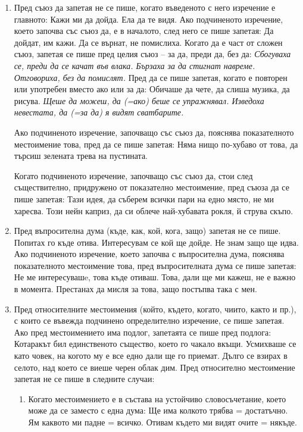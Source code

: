 \begin{enumerate}
\item Пред съюз да запетая не се пише, когато въведеното с него изречение е главното: Кажи ми да дойда. Ела да те видя. Ако подчиненото изречение, което започва със съюз да, е в началото, след него се пише запетая: Да дойдат, им кажи. Да се върнат, не помислиха.
Когато да е част от сложен съюз, запетая се пише пред целия съюз – за да, преди да, без да: \textit{Сбогуваха се, преди да се качат във влака. Бързаха за да стигнат навреме. Отговориха, без да помислят.}
Пред да се пише запетая, когато е повторен или употребен вместо ако или за да: Обичаше да чете, да слиша музика, да рисува. \textit{Щеше да можеш, да (=ако) беше се упражнявал. Изведоха невестата, да (=за да) я видят сватбарите.}

Ако подчиненото изречение, започващо със съюз да, пояснява показателното местоимение това, пред да се пише запетая: Няма нищо по-хубаво от това, да търсиш зелената трева на пустината.

Когато подчиненото изречение, започващо със съюз да, стои след съществително, придружено от показателно местоимение, пред съюза да се пише запетая: Тази идея, да съберем всички пари на едно място, не ми харесва. Този нейн каприз, да си облече най-хубавата рокля, й струва скъпо.

\item Пред въпросителна дума (къде, как, кой, кога, защо) запетая не се пише. Попитах го къде отива. Интересувам се кой ще дойде. Не знам защо ще идва.
Ако подчиненото изречение, което започва с въпросителна дума, пояснява показателното местоимение това, пред въпросителната дума се пише запетая: Не ме интересувашe, това къде отиваш. Това, дали ще ми кажеш, не е важно в момента. Престанах да мисля за това, защо постъпва така с мен.


\item Пред относителните местоимения (който, където, когато, чиито, както и пр.), с които се въвежда подчинено определително изречение, се пише запетая. Ако пред местоимението има подлог, запетаята се пише пред подлога: Котаракът бил единственото същество, което го чакало вкъщи. Усмихваше се като човек, на когото му е все едно дали ще го приемат. Дълго се взирах в селото, над което се виеше черен облак дим.
Пред относително местоимение запетая не се пише в следните случаи:

\begin{enumerate}
    \item Когато местоимението е в състава на устойчиво словосъчетание, което може да се заместо с една дума: Ще има колкото трябва = достатъчно. Ям каквото ми падне = всичко. Отивам където ми видят очите = някъде.
    

\end{enumerate}
\end{enumerate}
